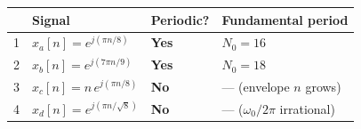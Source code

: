 \begin{answerbox}
\begin{center}
\begin{tabular}{clll}
  \toprule
  & Signal & Periodic? & Fundamental period \\
  \midrule
  1 & $x_a[n] = e^{j(\pi n/8)}$        & \textbf{Yes} & $N_0 = 16$ \\
  2 & $x_b[n] = e^{j(7\pi n/9)}$       & \textbf{Yes} & $N_0 = 18$ \\
  3 & $x_c[n] = n\,e^{j(\pi n/8)}$     & \textbf{No}  & --- (envelope $n$ grows) \\
  4 & $x_d[n] = e^{j(\pi n/\sqrt{8})}$ & \textbf{No}  & --- ($\omega_0/2\pi$ irrational) \\
  \bottomrule
\end{tabular}
\end{center}
\end{answerbox}


